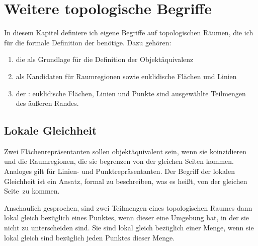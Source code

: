 \chapter{Weitere topologische Begriffe}\label{chap:topologie-erweiterung}

In diesem Kapitel definiere ich 
eigene Begriffe auf topologischen Räumen,
die ich für die formale Definition der \strukt benötige.
Dazu gehören:
\begin{enumerate}
    \item die  als Grundlage für die Definition der Objektäquivalenz
    \item {} als Kandidaten für Raumregionen sowie euklidische Flächen und Linien
    \item der : euklidische Flächen, Linien und Punkte sind ausgewählte Teilmengen des äußeren Randes.
\end{enumerate}


    


\section{Lokale Gleichheit}\label{sec:lokale-gleichheit}
    Zwei
    Flächenrepräsentanten sollen objektäquivalent sein, 
    wenn sie koinzidieren und die Raumregionen, die sie begrenzen \glqq von der gleichen Seiten kommen\grqq. 
    Analoges gilt für Linien- und Punktrepräsentanten. 
    Der Begriff der lokalen Gleichheit ist ein Ansatz, formal zu beschreiben, was es heißt, \glqq von der gleichen Seite\grqq\ zu kommen.
    
    Anschaulich gesprochen, sind zwei Teilmengen eines topologischen Raumes dann lokal gleich bezüglich eines Punktes, wenn dieser eine Umgebung hat, in der sie nicht zu unterscheiden sind.
    Sie sind lokal gleich bezüglich einer Menge, wenn sie lokal gleich sind bezüglich jeden Punktes dieser Menge.
    
